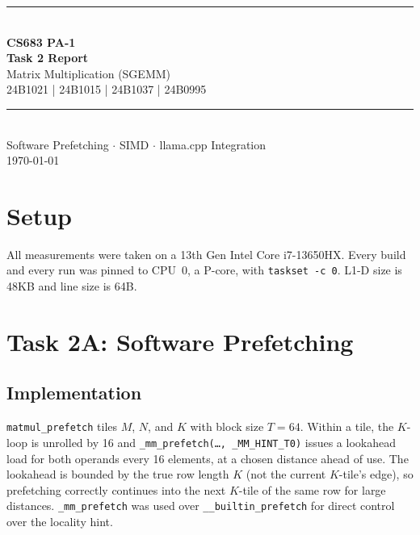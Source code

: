 \documentclass[11pt]{article}
\begin{document}
\begin{titlepage}
    \centering
    \vspace*{2.2cm}
    {\color{accent}\rule{0.5\textwidth}{1.2pt}}\\[0.6cm]
    {\Huge\bfseries\color{primary} CS683 PA-1}\\[0.4cm]
    {\LARGE\bfseries\color{primary} Task 2 Report}\\[0.3cm]
    {\Large Matrix Multiplication (SGEMM)}\\[0.6cm]
    {\large 24B1021 | 24B1015 | 24B1037 | 24B0995}\\[0.6cm]
    {\color{accent}\rule{0.5\textwidth}{1.2pt}}\\[1.4cm]

    {\large Software Prefetching \(\cdot\) SIMD \(\cdot\) llama.cpp Integration}\\[2cm]

    \vfill
    {\large \today}
\end{titlepage}

\tableofcontents
\newpage

\section*{Setup}

All measurements were taken on a 13th Gen Intel Core i7-13650HX. Every build and every run was
pinned to CPU~0, a P-core, with \texttt{taskset -c 0}. L1-D size is 48KB and line size is 64B.

\section{Task 2A: Software Prefetching}

\subsection{Implementation}

\texttt{matmul\_prefetch} tiles $M$, $N$, and $K$ with block size $T=64$. Within a tile, the $K$-loop is unrolled by 16 and
\texttt{\_mm\_prefetch(\ldots, \_MM\_HINT\_T0)} issues a lookahead load for
both operands every 16 elements, at a chosen distance ahead of use. The
lookahead is bounded by the true row length $K$ (not the current $K$-tile's
edge), so prefetching correctly continues into the next $K$-tile of the same
row for large distances. \texttt{\_mm\_prefetch} was used over
\texttt{\_\_builtin\_prefetch} for direct control over the locality hint.
\end{document}
